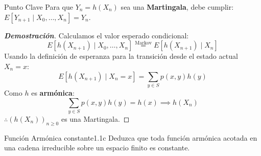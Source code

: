 \documentclass[10pt,a4paper]{article}
\begin{document}
 \vspace{2mm}

\begin{alerta}{Punto Clave}
    Para que $Y_n = h(X_n)$ sea una \textbf{Martingala}, debe cumplir:
    $E[Y_{n+1} \mid X_0, \dots, X_n] = Y_n$.
\end{alerta}

\begin{proof}[\textbf{Demostración}]
    Calculamos el valor esperado condicional:
    \[ E[h(X_{n+1}) \mid X_0, \dots, X_n] \stackrel{\text{Markov}}{=} E[h(X_{n+1}) \mid X_n] \]
    Usando la definición de esperanza para la transición desde el estado actual $X_n = x$:
    \[ E[h(X_{n+1}) \mid X_n = x] = \sum_{y \in S} p(x, y) h(y) \]
    Como $h$ es \textbf{armónica}:
    \[ \sum_{y \in S} p(x, y) h(y) = h(x) \implies h(X_n) \]
    $\therefore (h(X_n))_{n \geq 0}$ es una Martingala.
\end{proof}

\newpage

\begin{ejercicio}{Función Armónica constante}{1.1c}
    Deduzca que toda función armónica acotada en una cadena irreducible sobre un 
    espacio finito es constante.
\end{ejercicio}
\end{document}
